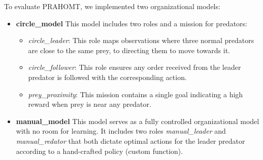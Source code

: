 \documentclass[sigconf,anonymous]{aamas}
\begin{document}
To evaluate PRAHOMT, we implemented two organizational models:

\begin{itemize}
  \item \textbf{circle\_model} \quad This model includes two roles and a mission for predators:
        \begin{itemize}
          \item \textit{circle\_leader}: This role maps observations where three normal predators are close to the same prey, to directing them to move towards it.
          \item \textit{circle\_follower}: This role ensures any order received from the leader predator is followed with the corresponding action.
          \item \textit{prey\_proximity}: This mission contains a single goal indicating a high reward when prey is near any predator.
        \end{itemize}

  \item \textbf{manual\_model} \quad This model serves as a fully controlled organizational model with no room for learning. It includes two roles \textit{manual\_leader} and \textit{manual\_redator} that both dictate optimal actions for the leader predator according to a hand-crafted policy (custom function).
\end{itemize}

\end{document}
